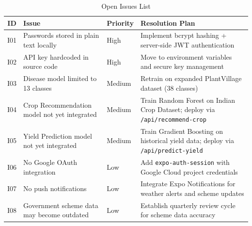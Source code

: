\documentclass[12pt,a4paper]{article}
\newcommand{\tablefont}{\fontsize{10}{12}\selectfont}
\begin{document}
\begin{table}[H]
\centering
\tablefont
\begin{tabular}{|c|p{4.5cm}|p{2cm}|p{4.5cm}|}
\hline
\textbf{ID} & \textbf{Issue} & \textbf{Priority} & \textbf{Resolution Plan} \\
\hline
I01 & Passwords stored in plain text locally & High & Implement bcrypt hashing + server-side JWT authentication \\
\hline
I02 & API key hardcoded in source code & High & Move to environment variables and secure key management \\
\hline
I03 & Disease model limited to 13 classes & Medium & Retrain on expanded PlantVillage dataset (38 classes) \\
\hline
I04 & Crop Recommendation model not yet integrated & Medium & Train Random Forest on Indian Crop Dataset; deploy via \texttt{/api/recommend-crop} \\
\hline
I05 & Yield Prediction model not yet integrated & Medium & Train Gradient Boosting on historical yield data; deploy via \texttt{/api/predict-yield} \\
\hline
I06 & No Google OAuth integration & Low & Add \texttt{expo-auth-session} with Google Cloud project credentials \\
\hline
I07 & No push notifications & Low & Integrate Expo Notifications for weather alerts and scheme updates \\
\hline
I08 & Government scheme data may become outdated & Low & Establish quarterly review cycle for scheme data accuracy \\
\hline
\end{tabular}
\caption{Open Issues List}
\end{table}
\end{document}
